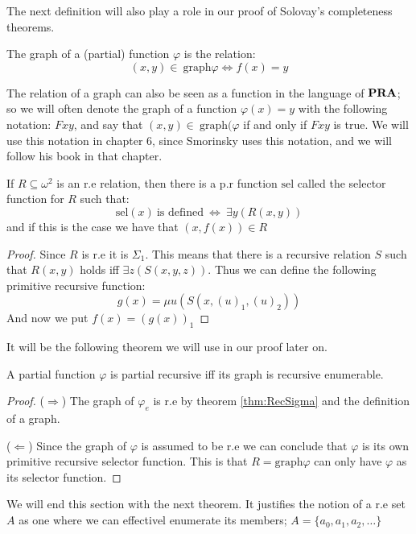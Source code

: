 \documentclass[../main.tex]{subfiles}
\begin{document}
The next definition will also play a role in our proof of Solovay's
completeness theorems.

\begin{defi}
	The graph of a (partial) function $\varphi$ is the relation:
	\[(x,y)\in\ \text{graph} \varphi\Leftrightarrow f(x)=y\]
\end{defi}
The relation of a graph can also be seen as a function in the language of
$\text{\textbf{PRA}}$; so we will often denote the graph of a function $\varphi(x)=y$ with the
following notation: $Fxy$, and say that $(x,y)\in\ \text{graph}(\varphi$ if and
only if $Fxy$ is true. We will use this notation in chapter 6, since Smorinsky
uses this notation, and we will follow his book \parencite{Smor1985} in that
chapter.

\begin{thm}
	If $R\subseteq\omega^2$ is an r.e relation, then there is a p.r
	function $\text{sel}$ called the selector function for $R$ such that:
	$$\text{sel}(x)\ \text{is defined}\ \Leftrightarrow\ \exists y(R(x,y))$$
	and if this is the case we have that $(x,f(x))\in R$
\end{thm}
\begin{proof}
	Since $R$ is r.e it is $\Sigma_1$. This means that there is a recursive
	relation $S$ such that $R(x,y)$ holds iff $\exists z (S(x,y,z))$. Thus
	we can define the following primitive recursive function:
	$$g(x)=\mu u(S(x,(u)_1,(u)_2))$$
	And now we put $f(x)=(g(x))_1$
\end{proof}
It will be the following theorem we will use in our proof later on.
\begin{thm}
	A partial function $\varphi$ is partial recursive iff its graph is recursive
	enumerable.
\end{thm}
\begin{proof}
	($\Rightarrow$) The graph of $\varphi_e$ is r.e by theorem \ref{thm:RecSigma} and the
	definition of a graph.

	($\Leftarrow$) Since the graph of $\varphi$ is assumed to be r.e we can
	conclude that $\varphi$ is its own primitive recursive selector function. This
	is that $R=\text{graph} \varphi$ can only have $\varphi$ as its selector function.
\end{proof}

We will end this section with the next theorem. It justifies the notion of a
r.e set $A$ as one where we can effectivel enumerate its members;
$A=\{a_0,a_1,a_2,\ldots\}$
\end{document}

